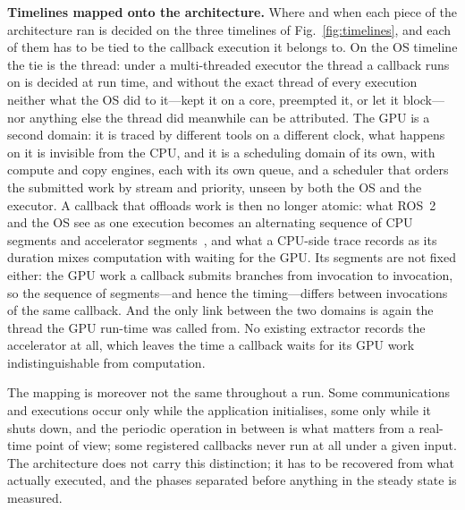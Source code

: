 \noindent\textbf{Timelines mapped onto the architecture.} Where and when each piece of the architecture ran is decided on the three timelines of Fig.~\ref{fig:timelines}, and each of them has to be tied to the callback execution it belongs to. On the OS timeline the tie is the thread: under a multi-threaded executor the thread a callback runs on is decided at run time, and without the exact thread of every execution neither what the OS did to it---kept it on a core, preempted it, or let it block---nor anything else the thread did meanwhile can be attributed. The GPU is a second domain: it is traced by different tools on a different clock, what happens on it is invisible from the CPU, and it is a scheduling domain of its own, with compute and copy engines, each with its own queue, and a scheduler that orders the submitted work by stream and priority, unseen by both the OS and the executor. A callback that offloads work is then no longer atomic: what ROS~2 and the OS see as one execution becomes an alternating sequence of CPU segments and accelerator segments~\cite{enright-2024-paam}, and what a CPU-side trace records as its duration mixes computation with waiting for the GPU. Its segments are not fixed either: the GPU work a callback submits branches from invocation to invocation, so the sequence of segments---and hence the timing---differs between invocations of the same callback. And the only link between the two domains is again the thread the GPU run-time was called from. No existing extractor records the accelerator at all, which leaves the time a callback waits for its GPU work indistinguishable from computation.

The mapping is moreover not the same throughout a run. Some communications and executions occur only while the application initialises, some only while it shuts down, and the periodic operation in between is what matters from a real-time point of view; some registered callbacks never run at all under a given input. The architecture does not carry this distinction; it has to be recovered from what actually executed, and the phases separated before anything in the steady state is measured.

